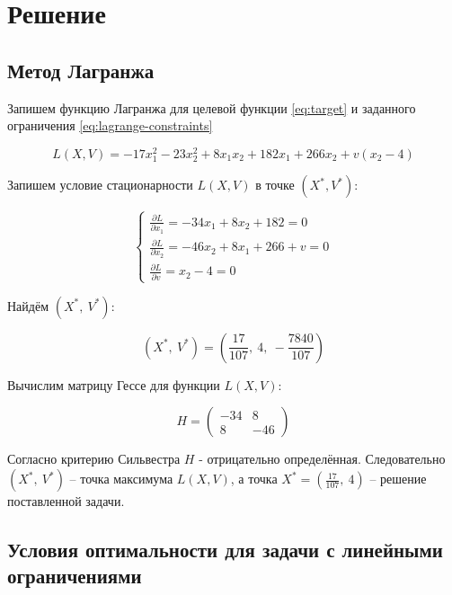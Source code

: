 \section{Решение}

\subsection{Метод Лагранжа}

Запишем функцию Лагранжа для целевой функции \ref{eq:target} и заданного ограничения \ref{eq:lagrange-constraints}

\begin{equation*}
	L(X, V) = -17 x^2_1 - 23 x^2_2 + 8 x_1 x_2 + 182 x_1 + 266 x_2 + v(x_2 - 4)
\end{equation*}

Запишем условие стационарности $L(X, V)$ в точке $(X^*, V^*)$:

\begin{equation*}
	\begin{cases}
		\frac{\partial L}{\partial x_1} = -34 x_1 + 8 x_2 + 182 = 0
		\\
		\frac{\partial L}{\partial x_2} = -46 x_2 + 8 x_1 + 266 + v = 0
		\\
		\frac{\partial L}{\partial v} = x_2 - 4 = 0
	\end{cases}
\end{equation*}

Найдём $(X^*,\ V^*)$:

\begin{equation*}
	(X^*,\ V^*) = \left( \frac{17}{107},\ 4,\ -\frac{7840}{107} \right)
\end{equation*}

Вычислим матрицу Гессе для функции $L(X, V)$:

\begin{equation*}
	H = \begin{pmatrix}
		-34 & 8
		\\
		8 & -46
	\end{pmatrix}
\end{equation*}

Согласно критерию Сильвестра $H$ - отрицательно определённая. Следовательно $(X^*,\ V^*)$ -- точка максимума $L(X, V)$, а точка $X^* = \left(\frac{17}{107},\ 4 \right)$ -- решение поставленной задачи.

\subsection{Условия оптимальности для задачи с линейными ограничениями}

